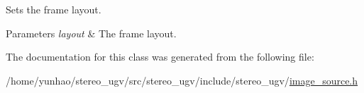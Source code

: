 Sets the frame layout. 


\begin{DoxyParams}{Parameters}
{\em layout} & The frame layout. \\
\hline
\end{DoxyParams}


The documentation for this class was generated from the following file\+:\begin{DoxyCompactItemize}
\item 
/home/yunhao/stereo\+\_\+ugv/src/stereo\+\_\+ugv/include/stereo\+\_\+ugv/\hyperlink{image__source_8h}{image\+\_\+source.\+h}\end{DoxyCompactItemize}
